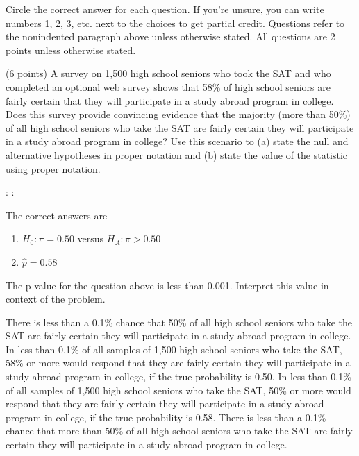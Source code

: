 \documentclass{article}
\begin{document}
	Circle the correct answer for each question.  If you're unsure, you can write numbers 1, 2, 3, etc. next to the choices to get partial credit.  Questions refer to the nonindented paragraph above unless otherwise stated.  All questions are 2 points unless otherwise stated.\\[.5cm]
	
	\begin{mcquestions}
		
		\question (6 points) A survey on 1,500 high school seniors who took the SAT and who completed an optional web survey shows that 58\% of high school seniors are fairly certain that they will participate in a study abroad program in college. Does this survey provide convincing evidence that the majority (more than 50\%) of all high school seniors who take the SAT are fairly certain they will participate in a study abroad program in college?  Use this scenario to (a) state the null and alternative hypotheses in proper notation and (b) state the value of the statistic using proper notation.
		\begin{mcanswerslist}[permutenone]
			\answer : \vspace{.5 in}
			\answer : 
		\end{mcanswerslist}
		\begin{mcexplanation}
			The correct answers are
			\begin{enumerate}[label=(\alph*)]
				\item \(H_0: \pi = 0.50\) versus \(H_A: \pi > 0.50\)
				\item \(\hat p=0.58\)
			\end{enumerate}
		\end{mcexplanation}
		
		\question[follow] The p-value for the question above is less than 0.001. Interpret this value in context of the problem. \label{sa3}
		\begin{mcanswerslist}
			\answer There is less than a 0.1\% chance that 50\% of all high school seniors who take the SAT are fairly certain they will participate in a study abroad program in college.
			\answer[correct] In less than 0.1\% of all samples of 1,500 high school seniors who take the SAT, 58\% or more would respond that they are fairly certain they will participate in a study abroad program in college, if the true probability is 0.50.
			\answer In less than 0.1\% of all samples of 1,500 high school seniors who take the SAT, 50\% or more would respond that they are fairly certain they will participate in a study abroad program in college, if the true probability is 0.58.
			\answer There is less than a 0.1\% chance that more than 50\% of all high school seniors who take the SAT are fairly certain they will participate in a study abroad program in college.
		\end{mcanswerslist}
		

\end{mcquestions}
\end{document}

